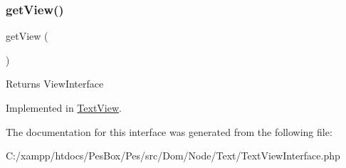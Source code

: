 \subsubsection{\texorpdfstring{get\+View()}{getView()}}
{\footnotesize\ttfamily get\+View (\begin{DoxyParamCaption}{ }\end{DoxyParamCaption})}

\begin{DoxyReturn}{Returns}
View\+Interface 
\end{DoxyReturn}


Implemented in \mbox{\hyperlink{class_pes_1_1_dom_1_1_node_1_1_text_1_1_text_view_a50677812ea3f0258f7d03bbac5265413}{Text\+View}}.



The documentation for this interface was generated from the following file\+:\begin{DoxyCompactItemize}
\item 
C\+:/xampp/htdocs/\+Pes\+Box/\+Pes/src/\+Dom/\+Node/\+Text/Text\+View\+Interface.\+php\end{DoxyCompactItemize}
